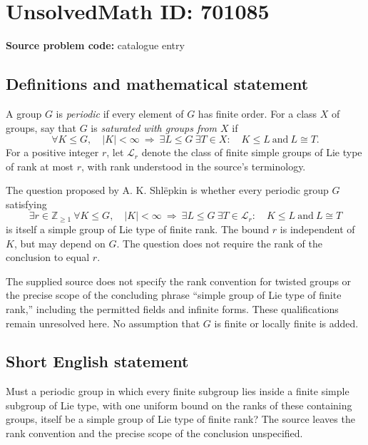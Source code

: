 \documentclass[11pt]{article}
\newcommand{\Z}{\mathbb{Z}}
\begin{document}
\section*{UnsolvedMath ID: 701085}
\textbf{Source problem code:} catalogue entry
\subsection{Definitions and mathematical statement}
A group \(G\) is \emph{periodic} if every element of \(G\) has finite order. For a class \(X\) of groups, say that \(G\) is \emph{saturated with groups from \(X\)} if
\[
\forall K\leq G,\quad |K|<\infty\ \Longrightarrow\ \exists L\leq G\ \exists T\in X:\quad K\leq L\ \text{and}\ L\cong T.
\]
For a positive integer \(r\), let \(\mathcal L_r\) denote the class of finite simple groups of Lie type of rank at most \(r\), with rank understood in the source's terminology.

The question proposed by A. K. Shl\"epkin is whether every periodic group \(G\) satisfying
\[
\exists r\in\Z_{\geq 1}\ \forall K\leq G,\quad
|K|<\infty\ \Longrightarrow\ \exists L\leq G\ \exists T\in\mathcal L_r:\quad K\leq L\ \text{and}\ L\cong T
\]
is itself a simple group of Lie type of finite rank. The bound \(r\) is independent of \(K\), but may depend on \(G\). The question does not require the rank of the conclusion to equal \(r\).

The supplied source does not specify the rank convention for twisted groups or the precise scope of the concluding phrase ``simple group of Lie type of finite rank,'' including the permitted fields and infinite forms. These qualifications remain unresolved here. No assumption that \(G\) is finite or locally finite is added.
\subsection{Short English statement}
Must a periodic group in which every finite subgroup lies inside a finite simple subgroup of Lie type, with one uniform bound on the ranks of these containing groups, itself be a simple group of Lie type of finite rank? The source leaves the rank convention and the precise scope of the conclusion unspecified.
\end{document}
